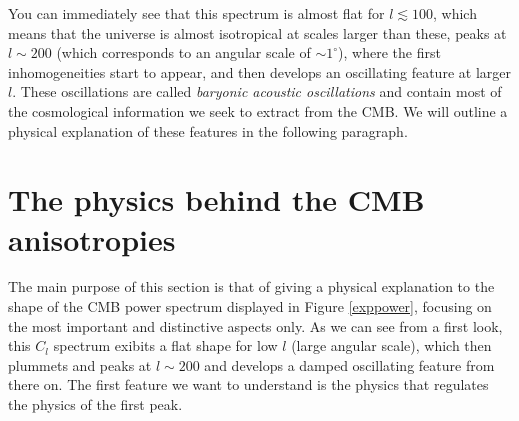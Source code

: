 \documentclass[11pt, a4paper,oneside,openright]{book}
\numberwithin{equation}{section}
\begin{document}
You can immediately see that this spectrum is almost flat for $l\lesssim 100$, which means that the universe is almost isotropical at scales larger than these, peaks at $l\sim 200$ (which corresponds to an angular scale of $\sim 1^\circ$), where the first inhomogeneities start to appear, and then develops an oscillating feature at larger $l$. These oscillations are called \textit{baryonic acoustic oscillations} and contain most of the cosmological information we seek to extract from the CMB. We will outline a physical explanation of these features in the following paragraph. 

\section{The physics behind the CMB anisotropies}
The main purpose of this section is that of giving a physical explanation to the shape of the CMB power spectrum displayed in Figure \ref{exppower}, focusing on the most important and distinctive aspects only. As we can see from a first look, this $C_l$ spectrum exibits a flat shape for low $l$ (large angular scale), which then plummets and peaks at $l\sim 200$ and develops a damped oscillating feature from there on. The first feature we want to understand is the physics that regulates the physics of the first peak.  
\end{document}
